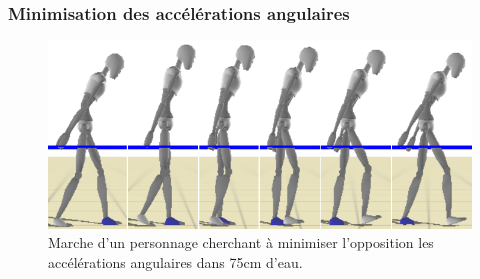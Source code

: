 \documentclass[runningheads,a4paper]{llncs}
\begin{document}
\subsubsection{Minimisation des accélérations angulaires}
\begin{figure}[h]
\centering
\includegraphics[scale=0.4]{strips/min_acc_75cm.png}
\caption{Marche d'un personnage cherchant à minimiser l'opposition les accélérations angulaires dans 75cm d'eau.}
\label{fig:min_acc}
\end{figure}
\end{document}
